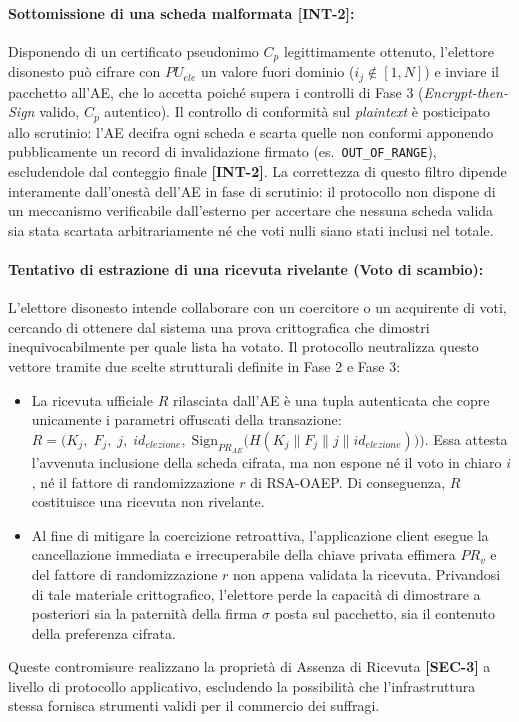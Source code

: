 \paragraph{Sottomissione di una scheda malformata \textbf{[INT-2]}:} Disponendo di un certificato pseudonimo $C_p$ legittimamente ottenuto, l'elettore disonesto può cifrare con $PU_{ele}$ un valore fuori dominio ($i_j \notin [1, N]$) e inviare il pacchetto all'AE, che lo accetta poiché supera i controlli di Fase 3 (\textit{Encrypt-then-Sign} valido, $C_p$ autentico). Il controllo di conformità sul \textit{plaintext} è posticipato allo scrutinio: l'AE decifra ogni scheda e scarta quelle non conformi apponendo pubblicamente un record di invalidazione firmato (es.\ \texttt{OUT\_OF\_RANGE}), escludendole dal conteggio finale \textbf{[INT-2]}. La correttezza di questo filtro dipende interamente dall'onestà dell'AE in fase di scrutinio: il protocollo non dispone di un meccanismo verificabile dall'esterno per accertare che nessuna scheda valida sia stata scartata arbitrariamente né che voti nulli siano stati inclusi nel totale.

\paragraph{Tentativo di estrazione di una ricevuta rivelante (Voto di scambio):} L'elettore disonesto intende collaborare con un coercitore o un acquirente di voti, cercando di ottenere dal sistema una prova crittografica che dimostri inequivocabilmente per quale lista ha votato. Il protocollo neutralizza questo vettore tramite due scelte strutturali definite in Fase 2 e Fase 3:
\begin{itemize}
    \item La ricevuta ufficiale $R$ rilasciata dall'AE è una tupla autenticata che copre unicamente i parametri offuscati della transazione:
    $R = \bigl(K_j,\; F_j,\; j,\; id_{elezione},\; \text{Sign}_{PR_{AE}}\!\bigl(H(K_j \parallel F_j \parallel j \parallel id_{elezione})\bigr)\bigr)$.
    Essa attesta l'avvenuta inclusione della scheda cifrata, ma non espone né il voto in chiaro $i$, né il fattore di randomizzazione $r$ di RSA-OAEP. Di conseguenza, $R$ costituisce una ricevuta non rivelante.
    \item Al fine di mitigare la coercizione retroattiva, l'applicazione client esegue la cancellazione immediata e irrecuperabile della chiave privata effimera $PR_v$ e del fattore di randomizzazione $r$ non appena validata la ricevuta. Privandosi di tale materiale crittografico, l'elettore perde la capacità di dimostrare a posteriori sia la paternità della firma $\sigma$ posta sul pacchetto, sia il contenuto della preferenza cifrata.
\end{itemize}
Queste contromisure realizzano la proprietà di Assenza di Ricevuta \textbf{[SEC-3]} a livello di protocollo applicativo, escludendo la possibilità che l'infrastruttura stessa fornisca strumenti validi per il commercio dei suffragi.


